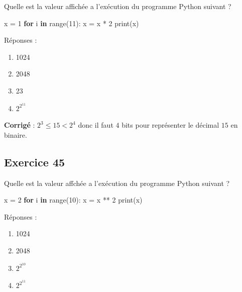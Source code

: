 \documentclass[11pt]{article}
\providecommand{\tightlist}{%
      \setlength{\itemsep}{0pt}\setlength{\parskip}{0pt}}
\newenvironment{Shaded}{}{}
\newcommand{\KeywordTok}[1]{\textcolor[rgb]{0.00,0.44,0.13}{\textbf{{#1}}}}
\newcommand{\DecValTok}[1]{\textcolor[rgb]{0.25,0.63,0.44}{{#1}}}
\newcommand{\NormalTok}[1]{{#1}}
\newcommand{\ControlFlowTok}[1]{\textcolor[rgb]{0.00,0.44,0.13}{\textbf{{#1}}}}
\newcommand{\OperatorTok}[1]{\textcolor[rgb]{0.40,0.40,0.40}{{#1}}}
\newcommand{\BuiltInTok}[1]{{#1}}
\begin{document}
Quelle est la valeur affichée a l'exécution du programme Python suivant
?

\begin{Shaded}
\begin{Highlighting}[]
\NormalTok{x }\OperatorTok{=} \DecValTok{1} 
\ControlFlowTok{for}\NormalTok{ i }\KeywordTok{in} \BuiltInTok{range}\NormalTok{(}\DecValTok{11}\NormalTok{): }
\NormalTok{    x }\OperatorTok{=}\NormalTok{ x }\OperatorTok{*} \DecValTok{2} 
\BuiltInTok{print}\NormalTok{(x)}
\end{Highlighting}
\end{Shaded}

Réponses :

\begin{enumerate}
\def\labelenumi{\arabic{enumi}.}
\tightlist
\item
  1024
\item
  2048
\item
  23
\item
  \(2^{2^{11}}\)
\end{enumerate}

    \textbf{Corrigé} : \(2^{3} \leqslant 15 < 2^{4}\) donc il faut \(4\)
bits pour représenter le décimal \(15\) en binaire.

    \hypertarget{exercice-45}{%
\subsection{Exercice 45}\label{exercice-45}}

Quelle est la valeur affchée a l'exécution du programme Python suivant ?

\begin{Shaded}
\begin{Highlighting}[]
\NormalTok{x }\OperatorTok{=} \DecValTok{2} 
\ControlFlowTok{for}\NormalTok{ i }\KeywordTok{in} \BuiltInTok{range}\NormalTok{(}\DecValTok{10}\NormalTok{): }
\NormalTok{    x }\OperatorTok{=}\NormalTok{ x }\OperatorTok{**} \DecValTok{2} 
\BuiltInTok{print}\NormalTok{(x)}
\end{Highlighting}
\end{Shaded}

Réponses :

\begin{enumerate}
\def\labelenumi{\arabic{enumi}.}
\tightlist
\item
  1024
\item
  2048
\item
  \(2^{2^{10}}\)
\item
  \(2^{2^{11}}\)
\end{enumerate}
\end{document}
